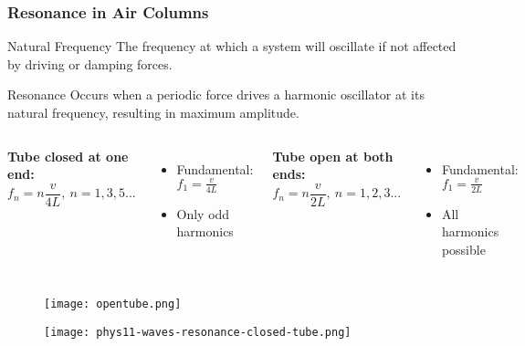 \documentclass{beamer}
\begin{document}
\begin{frame}
\frametitle{Resonance in Air Columns}
\begin{block}{Natural Frequency}
The frequency at which a system will oscillate if not affected by driving or damping forces.
\end{block}

\begin{block}{Resonance}
Occurs when a periodic force drives a harmonic oscillator at its natural frequency, resulting in maximum amplitude.
\end{block}

\begin{columns}
\textbf{Tube closed at one end:}
\begin{equation}
f_n = n\frac{v}{4L}, \: n = 1,3,5...
\end{equation}
\begin{itemize}
\item Fundamental: $f_1 = \frac{v}{4L}$
\item Only odd harmonics
\end{itemize}

\textbf{Tube open at both ends:}
\begin{equation}
f_n = n\frac{v}{2L}, \: n = 1,2,3...
\end{equation}
\begin{itemize}
\item Fundamental: $f_1 = \frac{v}{2L}$
\item All harmonics possible
\end{itemize}


\end{columns}
\end{frame}

\begin{frame}{}
    
\begin{figure}
    \centering
    \texttt{[image: opentube.png]}
\end{figure}

\end{frame}
\begin{frame}{}
    
\begin{figure}
    \centering
    \texttt{[image: phys11-waves-resonance-closed-tube.png]}
\end{figure}
\end{frame}
\end{document}
